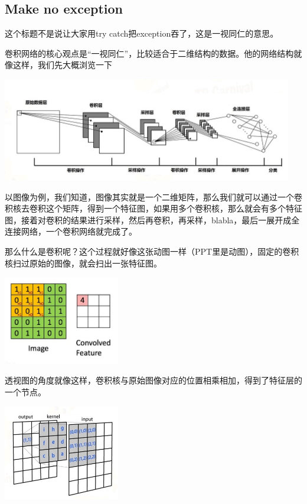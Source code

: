 \documentclass{article}
\begin{document}
\subsection{Make no exception}
这个标题不是说让大家用try catch把exception吞了，这是一视同仁的意思。

卷积网络的核心观点是“一视同仁”，比较适合于二维结构的数据。他的网络结构就像这样，我们先大概浏览一下

\begin{center}
\includegraphics[width=5in]{image/image024.jpg}
\end{center}

以图像为例，我们知道，图像其实就是一个二维矩阵，那么我们就可以通过一个卷积核去卷积这个矩阵，得到一个特征图，如果用多个卷积核，那么就会有多个特征图，接着对卷积的结果进行采样，然后再卷积，再采样，blabla，最后一展开成全连接网络，一个卷积网络就完成了。

那么什么是卷积呢？这个过程就好像这张动图一样（PPT里是动图），固定的卷积核扫过原始的图像，就会扫出一张特征图。
\begin{center}
\includegraphics[width=2in]{image/image0250.jpg}
\end{center}
透视图的角度就像这样，卷积核与原始图像对应的位置相乘相加，得到了特征层的一个节点。
\begin{center}
\includegraphics[width=2in]{image/image0251.jpg}
\end{center}
\end{document}

